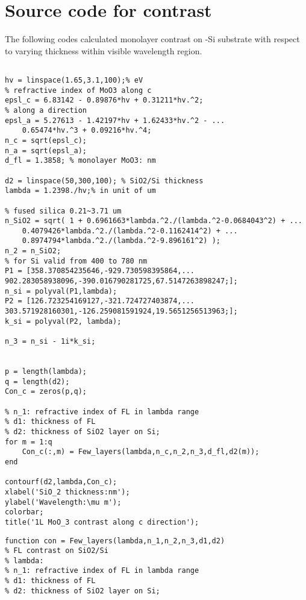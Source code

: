 
\chapter{Source code for contrast}\label{app:matlab}

The following codes calculated monolayer  contrast on -Si substrate with respect to varying  thickness within visible wavelength region. 
\begin{singlespace}
\begin{lstlisting}

hv = linspace(1.65,3.1,100);% eV
% refractive index of MoO3 along c
epsl_c = 6.83142 - 0.89876*hv + 0.31211*hv.^2;
% along a direction
epsl_a = 5.27613 - 1.42197*hv + 1.62433*hv.^2 - ...
    0.65474*hv.^3 + 0.09216*hv.^4;
n_c = sqrt(epsl_c);
n_a = sqrt(epsl_a);
d_fl = 1.3858; % monolayer MoO3: nm

d2 = linspace(50,300,100); % SiO2/Si thickness
lambda = 1.2398./hv;% in unit of um

% fused silica 0.21~3.71 um
n_SiO2 = sqrt( 1 + 0.6961663*lambda.^2./(lambda.^2-0.0684043^2) + ...
    0.4079426*lambda.^2./(lambda.^2-0.1162414^2) + ...
    0.8974794*lambda.^2./(lambda.^2-9.896161^2) );
n_2 = n_SiO2;
% for Si valid from 400 to 780 nm
P1 = [358.370854235646,-929.730598395864,...
902.283058938096,-390.016790281725,67.5147263898247;];
n_si = polyval(P1,lambda);
P2 = [126.723254169127,-321.724727403874,...
303.571928160301,-126.259081591924,19.5651256513963;];
k_si = polyval(P2, lambda);

n_3 = n_si - 1i*k_si;


p = length(lambda);
q = length(d2);
Con_c = zeros(p,q);

% n_1: refractive index of FL in lambda range
% d1: thickness of FL
% d2: thickness of SiO2 layer on Si;
for m = 1:q
    Con_c(:,m) = Few_layers(lambda,n_c,n_2,n_3,d_fl,d2(m));
end

contourf(d2,lambda,Con_c);
xlabel('SiO_2 thickness:nm');
ylabel('Wavelength:\mu m');
colorbar;
title('1L MoO_3 contrast along c direction');
\end{lstlisting}

\begin{lstlisting}
function con = Few_layers(lambda,n_1,n_2,n_3,d1,d2)
% FL contrast on SiO2/Si
% lambda:
% n_1: refractive index of FL in lambda range
% d1: thickness of FL
% d2: thickness of SiO2 layer on Si;


\end{lstlisting}
\end{singlespace}

